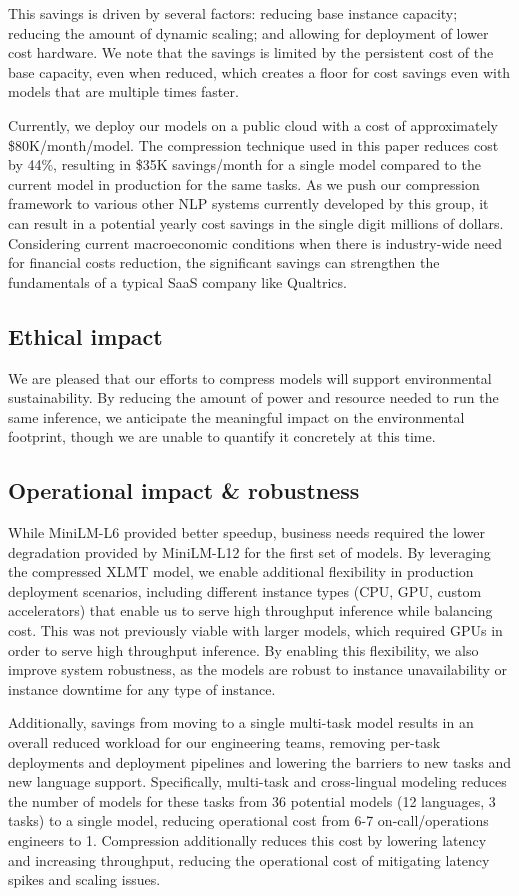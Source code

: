 This savings is driven by several factors: reducing base instance capacity; reducing the amount of dynamic scaling; and allowing for deployment of lower cost hardware.
We note that the savings is limited by the persistent cost of the base capacity, even when reduced, which creates a floor for cost savings even with models that are multiple times faster.

Currently, we deploy our models on a public cloud with a cost of approximately \$80K/month/model.
The compression technique used in this paper reduces cost by 44\%, resulting in \$35K savings/month for a single model compared to the current model in production for the same tasks.
As we push our compression framework to various other NLP systems currently developed by this group, it can result in a potential yearly cost savings in the single digit millions of dollars.
Considering current macroeconomic conditions when there is industry-wide need for financial costs reduction, the significant savings can strengthen the fundamentals of a typical SaaS company like Qualtrics. 

\subsection*{Ethical impact}
We are pleased that our efforts to compress models will support environmental sustainability.
By reducing the amount of power and resource needed to run the same inference, we anticipate the meaningful impact on the environmental footprint, though we are unable to quantify it concretely at this time.

\subsection*{Operational impact \& robustness}
While MiniLM-L6 provided better speedup, business needs required the lower degradation provided by MiniLM-L12 for the first set of models.
By leveraging the compressed XLMT model, we enable additional flexibility in production deployment scenarios, including different instance types (CPU, GPU, custom accelerators) that enable us to serve high throughput inference while balancing cost.
This was not previously viable with larger models, which required GPUs in order to serve high throughput inference.
By enabling this flexibility, we also improve system robustness, as the models are robust to instance unavailability or instance downtime for any type of instance.

Additionally, savings from moving to a single multi-task model results in an overall reduced workload for our engineering teams, removing per-task deployments and deployment pipelines and lowering the barriers to new tasks and new language support.
Specifically, multi-task and cross-lingual modeling reduces the number of models for these tasks from 36 potential models (12 languages, 3 tasks) to a single model, reducing operational cost from 6-7 on-call/operations engineers to 1.
Compression additionally reduces this cost by lowering latency and increasing throughput, reducing the operational cost of mitigating latency spikes and scaling issues.

